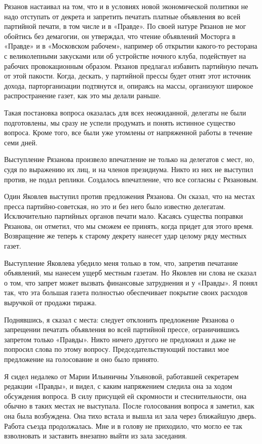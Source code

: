 \documentclass[12pt, a4paper, openany]{book}
\begin{document}
Рязанов настаивал на том, что и в условиях новой экономической политики не надо отступать от декрета и запретить печатать платные объявления во всей партийной печати, в том числе и в «Правде». По своей натуре Рязанов не мог обойтись без демагогии, он утверждал, что чтение объявлений Мосторга в «Правде» и в «Московском рабочем», например об открытии какого-то ресторана с великолепными закусками или об устройстве ночного клуба, подействует на рабочих провокационным образом. Рязанов предлагал избавить партийную печать от этой пакости. Когда, дескать, у партийной прессы будет отнят этот источник дохода, парторганизации подтянутся и, опираясь на массы, организуют широкое распространение газет, как это мы делали раньше.

Такая постановка вопроса оказалась для всех неожиданной, делегаты не были подготовлены, мы сразу не успели продумать и понять истинное существо вопроса. Кроме того, все были уже утомлены от напряженной работы в течение семи дней.

Выступление Рязанова произвело впечатление не только на делегатов с мест, но, судя по выражению их лиц, и на членов президиума. Никто из них не выступил против, не подал реплики. Создалось впечатление, что все согласны с Рязановым.

Один Яковлев выступил против предложения Рязанова. Он сказал, что на местах пресса партийно-советская, но это и без него было известно делегатам. Исключительно партийных органов печати мало. Касаясь существа поправки Рязанова, он отметил, что мы сможем ее принять, когда придет для этого время. Возвращение же теперь к старому декрету нанесет удар целому ряду местных газет.

Выступление Яковлева убедило меня только в том, что, запретив печатание объявлений, мы нанесем ущерб местным газетам. Но Яковлев ни слова не сказал о том, что запрет может вызвать финансовые затруднения и у «Правды». Я понял так, что эта большая газета полностью обеспечивает покрытие своих расходов выручкой от продажи тиража.

Поднявшись, я сказал с места: следует отклонить предложение Рязанова о запрещении печатать объявления во всей партийной прессе, ограничившись запретом только «Правды». Никто ничего другого не предложил и даже не попросил слова по этому вопросу. Председательствующий поставил мое предложение на голосование и оно было принято.

Я сидел недалеко от Марии Ильиничны Ульяновой, работавшей секретарем редакции «Правды», и видел, с каким напряжением следила она за ходом обсуждения вопроса. В силу присущей ей скромности и стеснительности, она обычно в таких местах не выступала. После голосования вопроса я заметил, как она была возбуждена. Она тихо встала и вышла ил зала через ближайшую дверь. Работа съезда продолжалась. Мне и в голову не приходило, что могло ее так взволновать и заставить внезапно выйти из зала заседания.
\end{document}

